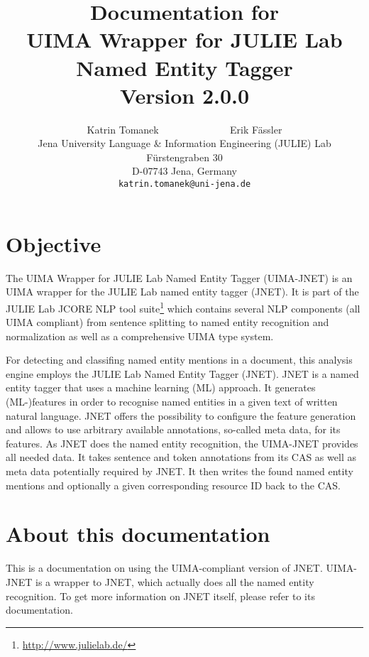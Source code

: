 \documentclass[11pt,a4paper,halfparskip]{scrartcl}
\title{\small{Documentation for}\\\huge UIMA Wrapper for JULIE Lab Named Entity Tagger\\\vspace{3mm}\small{Version 2.0.0}}
\author{\normalsize Katrin Tomanek ~~~~~~~~~~~~~ Erik F\"assler\\
  \normalsize  Jena University Language \& Information Engineering (JULIE) Lab\\
  \normalsize F\"urstengraben 30 \\
  \normalsize D-07743 Jena, Germany\\
  {\normalsize \tt katrin.tomanek@uni-jena.de} }
\date{}
\begin{document}
\maketitle

\section{Objective}

The UIMA Wrapper for JULIE Lab Named Entity Tagger (UIMA-JNET) is an
UIMA wrapper for the JULIE Lab named entity tagger (JNET).  It is part
of the JULIE Lab JCORE NLP tool suite\footnote{\url{http://www.julielab.de/}}
which contains several NLP components (all UIMA compliant) from
sentence splitting to named entity recognition and normalization as
well as a comprehensive UIMA type system.

For detecting and classifing named entity mentions in a document, this
analysis engine employs the JULIE Lab Named Entity Tagger (JNET). JNET
is a named entity tagger that uses a machine learning (ML) approach.
It generates (ML-)features in order to recognise named entities in a
given text of written natural language.  JNET offers the possibility
to configure the feature generation and allows to use arbitrary
available annotations, so-called meta data, for its features. As JNET
does the named entity recognition, the UIMA-JNET provides all needed
data. It takes sentence and token annotations from its CAS as well as
meta data potentially required by JNET. It then writes the found named
entity mentions and optionally a given corresponding resource ID back
to the CAS.


\section{About this documentation}
This is a documentation on using the UIMA-compliant version of
JNET. UIMA-JNET is a wrapper to JNET, which actually does all the
named entity recognition. To get more information on JNET itself,
please refer to its documentation.
\end{document}

